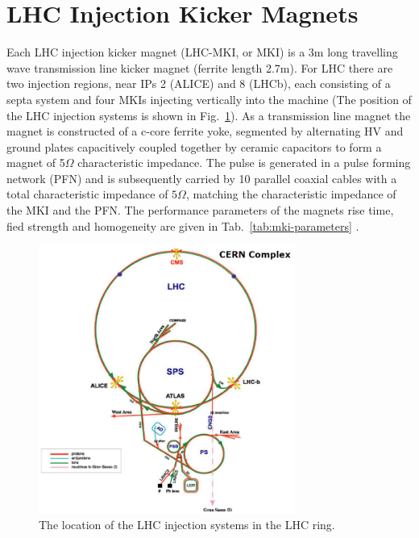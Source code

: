 \section{LHC Injection Kicker Magnets}

Each LHC injection kicker magnet (LHC-MKI, or MKI) is a 3m long travelling wave transmission line kicker magnet (ferrite length 2.7m). For LHC there are two injection regions, near IPs 2 (ALICE) and 8 (LHCb), each consisting of a septa system and four MKIs injecting vertically into the machine (The position of the LHC injection systems is shown in Fig.~\ref{fig:lhc-injection-systems}). As a transmission line magnet the magnet is constructed of a c-core ferrite yoke, segmented by alternating HV and ground plates capacitively coupled together by ceramic capacitors to form a magnet of 5$\Omega$ characteristic impedance. The pulse is generated in a pulse forming network (PFN) and is subsequently carried by 10 parallel coaxial cables with a total characteristic impedance of $5 \Omega$, matching the characteristic impedance of the MKI and the PFN. The performance parameters of the magnets rise time, fied strength and homogeneity are given in Tab.~\ref{tab:mki-parameters} \cite{Ducimetiere:mkiSpec}.

\begin{figure}
\begin{center}
\includegraphics[width=0.75\textwidth]{LHC_MKI/figures/injection-points-lhc.png}
\end{center}
\caption{The location of the LHC injection systems in the LHC ring.}
\label{fig:lhc-injection-systems}
\end{figure}


